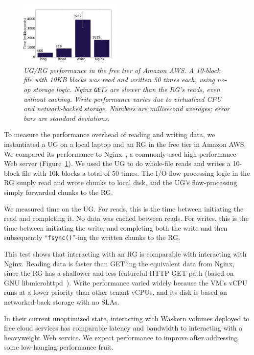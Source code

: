 \begin{figure}[t!]
\centering
\includegraphics[width=0.47\textwidth]{figures/data-performance}
\caption{\it  UG/RG performance in the free tier of Amazon AWS.  A 10-block file
   with 10KB blocks was read and written 50 times each, using no-op storage
   logic.  Nginx \texttt{GET}s are slower than the RG's reads, even without caching.
   Write performance varies due to virtualized CPU and network-backed storage.
   Numbers are millisecond averages; error bars are standard deviations.}
\label{fig:data-performance}
\end{figure}

To measure the performance overhead of reading and writing data, we instantiated
a UG on a local laptop and an RG in the free tier in Amazon AWS.  We compared
its performance to Nginx~\cite{nginx}, a commonly-used high-performance Web
server (Figure~\ref{fig:data-performance}).  We used the UG to do whole-file
reads and writes a 10-block file with 10k blocks a total of 50 times.
The I/O flow processing logic in the RG simply read and
wrote chunks to local disk, and the UG's flow-processing simply
forwarded chunks to the RG.

We measured time on the UG.  For reads, this is the time between initiating the
read and completing it.  No data was cached between reads.  For writes, this is
the time between initiating the write, and completing both the write and then
subsequently ``\texttt{fsync()}''-ing the written chunks to the RG.

This test shows that interacting with an RG is comparable with interacting with Nginx.
Reading data is faster than GET'ing the equivalent data from Nginx,
since the RG has a shallower and less featureful HTTP GET path (based on
GNU libmicrohttpd~\cite{libmicrohttpd}).  Write performance varied widely because the VM's vCPU runs at a lower priority
than other tenant vCPUs, and its disk is based on networked-back storage with no
SLAs. 

In their current unoptimized state, interacting with Waskern volumes deployed to
free cloud services has comparable latency and bandwidth to interacting with a heavyweight
Web service.  We expect performance to improve after addressing some low-hanging
performance fruit.


